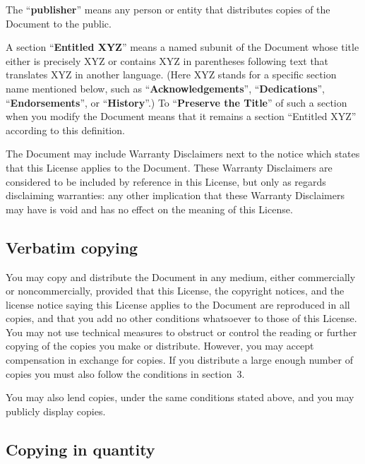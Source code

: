 \documentclass[letterpaper,twoside]{scrartcl}
\begin{document}
   The ``\textbf{publisher}'' means any person or entity that distributes
   copies of the Document to the public.

   A section ``\textbf{Entitled XYZ}'' means a named subunit of the Document whose
   title either is precisely XYZ or contains XYZ in parentheses following
   text that translates XYZ in another language.  (Here XYZ stands for a
   specific section name mentioned below, such as ``\textbf{Acknowledgements}'',
   ``\textbf{Dedications}'', ``\textbf{Endorsements}'', or ``\textbf{History}''.)  
   To ``\textbf{Preserve the Title}''
   of such a section when you modify the Document means that it remains a
   section ``Entitled XYZ'' according to this definition.

   The Document may include Warranty Disclaimers next to the notice which
   states that this License applies to the Document.  These Warranty
   Disclaimers are considered to be included by reference in this
   License, but only as regards disclaiming warranties: any other
   implication that these Warranty Disclaimers may have is void and has
   no effect on the meaning of this License.


   
   
   \subsection{Verbatim copying}
   

   You may copy and distribute the Document in any medium, either
   commercially or noncommercially, provided that this License, the
   copyright notices, and the license notice saying this License applies
   to the Document are reproduced in all copies, and that you add no other
   conditions whatsoever to those of this License.  You may not use
   technical measures to obstruct or control the reading or further
   copying of the copies you make or distribute.  However, you may accept
   compensation in exchange for copies.  If you distribute a large enough
   number of copies you must also follow the conditions in section~3.

   You may also lend copies, under the same conditions stated above, and
   you may publicly display copies.


   
   
   \subsection{Copying in quantity}
   
\end{document}
